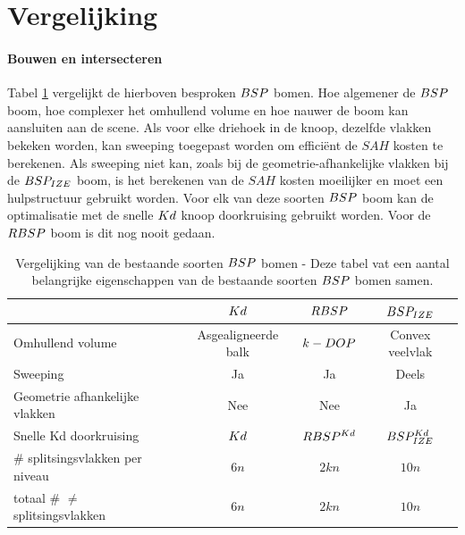  
\section{Vergelijking}
\paragraph{Bouwen en intersecteren} 
Tabel \ref{tab:boom-vergelijking} vergelijkt de hierboven besproken $\symBSP$ bomen.
Hoe algemener de $\symBSP$ boom, hoe complexer het omhullend volume en hoe nauwer de boom kan aansluiten aan de scene.
Als voor elke driehoek in de knoop, dezelfde vlakken bekeken worden, kan sweeping toegepast worden om efficiënt de $SAH$ kosten te berekenen.
Als sweeping niet kan, zoals bij de geometrie-afhankelijke vlakken bij de $BSP_{IZE}$ boom, is het berekenen van de $SAH$ kosten moeilijker en moet een hulpstructuur gebruikt worden.
Voor elk van deze soorten $\symBSP$ boom kan de optimalisatie met de snelle $Kd$ knoop doorkruising gebruikt worden. Voor de $RBSP$ boom is dit nog nooit gedaan.

\begin{table}[tb]
    \centering
    \begin{tabular}{@{}|l|c|c|c|@{}} \toprule      
            & $Kd$     & $RBSP$ & $BSP_{IZE}$ \\ \midrule
      Omhullend volume & Asgealigneerde balk & $k-DOP$ & Convex veelvlak \\
      Sweeping                              &  Ja   & Ja & Deels    \\
      Geometrie afhankelijke vlakken & Nee & Nee & Ja \\
      Snelle Kd doorkruising                 & $Kd$  & $RBSP^{Kd}$ \footnotemark[1] & $BSP^{Kd}_{IZE}$    \\
      \# splitsingsvlakken per niveau       &  $6n$   & $2kn$ & $10n$  \\
      totaal \# $\neq$ splitsingsvlakken           &  $6n$   & $2kn$ & $10n$     \\ \bottomrule
    \end{tabular}
    \caption[Vergelijking van de bestaande soorten $\symBSP$ bomen.]{Vergelijking van de bestaande soorten $\symBSP$ bomen - \small Deze tabel vat een aantal belangrijke eigenschappen van de bestaande soorten $\symBSP$ bomen samen. }
    \label{tab:boom-vergelijking}
  \end{table}

